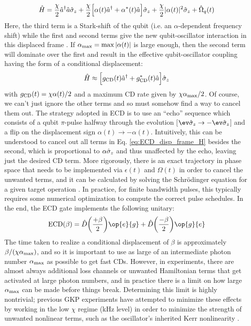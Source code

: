 \begin{equation}
    \hat{H} = \frac{\chi}{2}\hat{a}^\dagger\hat{a}\hat{\sigma}_z + \frac{\chi}{2}\Big[\alpha(t)\hat{a}^\dagger + \alpha^\ast(t)\hat{a}\Big]\hat{\sigma}_z + \frac{\chi}{2}|\alpha(t)|^2\hat{\sigma}_z +  \hat{\Omega}_q(t)
    \label{eq:ECD_disp_frame_H}
\end{equation}
Here, the third term is a Stark-shift of the qubit (i.e. an $\alpha$-dependent frequency shift) while the first and second terms give the new qubit-oscillator interaction in this displaced frame \cite{murch2012cavity, eddins2018stroboscopic}. If $\alpha_{\rm max} = \max|\alpha(t)|$ is large enough, then the second term will dominate over the first and result in the effective qubit-oscillator coupling having the form of a conditional displacement: 
\begin{equation}
    \hat{H} \approx \Big[g_{\rm CD}(t)\hat{a}^\dagger + g_{\rm CD}^\ast(t)\hat{a}\Big]\hat{\sigma}_z
\end{equation}
with $g_{\rm CD}(t) = \chi\alpha(t)/2$ and a maximum CD rate given by $\chi\alpha_{\rm max}/2$. Of course, we can't just ignore the other terms and so must somehow find a way to cancel them out. The strategy adopted in ECD is to use an ``echo'' sequence which consists of a qubit $\pi$-pulse halfway through the evolution [$\ev\sigmaz \to -\ev\sigmaz$] and a flip on the displacement sign $\alpha(t) \to -\alpha(t)$. Intuitively, this can be understood to cancel out all terms in Eq. \eqref{eq:ECD_disp_frame_H} besides the second, which is proportional to $\alpha\hat{\sigma}_z$ and thus unaffected by the echo, leaving just the desired CD term. More rigorously, there is an exact trajectory in phase space that needs to be implemented via $\epsilon(t)$ and $\Omega(t)$ in order to cancel the unwanted terms, and it can be calculated by solving the Schr\"odinger equation for a given target operation \cite{eickbusch2022fast}. In practice, for finite bandwidth pulses, this typically requires some numerical optimization to compute the correct pulse schedules. In the end, the ECD gate implements the following unitary:
\begin{equation}
    {\rm ECD}(\beta) = \hat{D}\bigg(\frac{+\beta}{2}\bigg)\op{e}{g} + \hat{D}\bigg(\frac{-\beta}{2}\bigg)\op{g}{e}
\end{equation}
The time taken to realize a conditional displacement of $\beta$ is approximately $\beta / (\chi\alpha_{\rm max})$, and so it is important to use as large of an intermediate photon number $\alpha_{\rm max}$ as possible to get fast CDs. However, in experiments, there are almost always additional loss channels or unwanted Hamiltonian terms that get activated at large photon numbers, and in practice there is a limit on how large $\alpha_{\rm max}$ can be made before things break. Determining this limit is highly nontrivial; previous GKP experiments have attempted to minimize these effects by working in the low $\chi$ regime (kHz level) in order to minimize the strength of unwanted nonlinear terms, such as the oscillator's inherited Kerr nonlinearity \cite{campagne2020gkp-expt, eickbusch2022fast, sivak2023gkp-expt, nordquantique2023gkp-expt}. 

